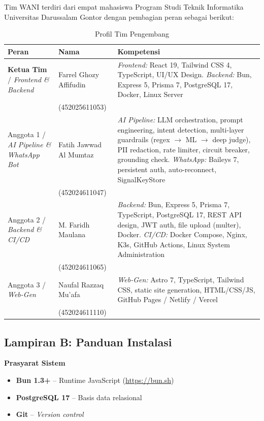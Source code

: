 \documentclass[12pt,a4paper,oneside]{article}
\begin{document}
Tim WANI terdiri dari empat mahasiswa Program Studi Teknik Informatika Universitas Darussalam Gontor dengan pembagian peran sebagai berikut:

\begin{table}[H]
	\centering
	\caption{Profil Tim Pengembang}
	\label{tab:tim}
	\begin{tabularx}{\textwidth}{p{3.5cm}p{4cm}X}
		\toprule
		\textbf{Peran} & \textbf{Nama} & \textbf{Kompetensi} \\
		\midrule
		\textbf{Ketua Tim} / \textit{Frontend \& Backend} &
		Farrel Ghozy Affifudin &
		\textit{Frontend:} React 19, Tailwind CSS 4, TypeScript, UI/UX Design. %
		\textit{Backend:} Bun, Express 5, Prisma 7, PostgreSQL 17, Docker, Linux Server \\
		& (452025611053) & \\
		\addlinespace
		Anggota 1 / \textit{AI Pipeline \& WhatsApp Bot} &
		Fatih Jawwad Al Mumtaz &
		\textit{AI Pipeline:} LLM orchestration, prompt engineering, intent detection, %
		multi-layer guardrails (regex $\rightarrow$ ML $\rightarrow$ deep judge), %
		PII redaction, rate limiter, circuit breaker, grounding check. %
		\textit{WhatsApp:} Baileys 7, persistent auth, auto-reconnect, SignalKeyStore \\
		& (452024611047) & \\
		\addlinespace
		Anggota 2 / \textit{Backend \& CI/CD} &
		M. Faridh Maulana &
		\textit{Backend:} Bun, Express 5, Prisma 7, TypeScript, PostgreSQL 17, %
		REST API design, JWT auth, file upload (multer), Docker. %
		\textit{CI/CD:} Docker Compose, Nginx, K3s, GitHub Actions, %
		Linux System Administration \\
		& (452024611065) & \\
		\addlinespace
		Anggota 3 / \textit{Web-Gen} &
		Naufal Razzaq Mu'afa &
		\textit{Web-Gen:} Astro 7, TypeScript, Tailwind CSS, static site generation, %
		HTML/CSS/JS, GitHub Pages / Netlify / Vercel \\
		& (452024611110) & \\
	\end{tabularx}
\end{table}


\subsection*{Lampiran B: Panduan Instalasi}

\textbf{Prasyarat Sistem}
\begin{itemize}
	\item \textbf{Bun 1.3+} -- Runtime JavaScript (\url{https://bun.sh})
	\item \textbf{PostgreSQL 17} -- Basis data relasional
	\item \textbf{Git} -- \textit{Version control}
\end{itemize}
\end{document}
